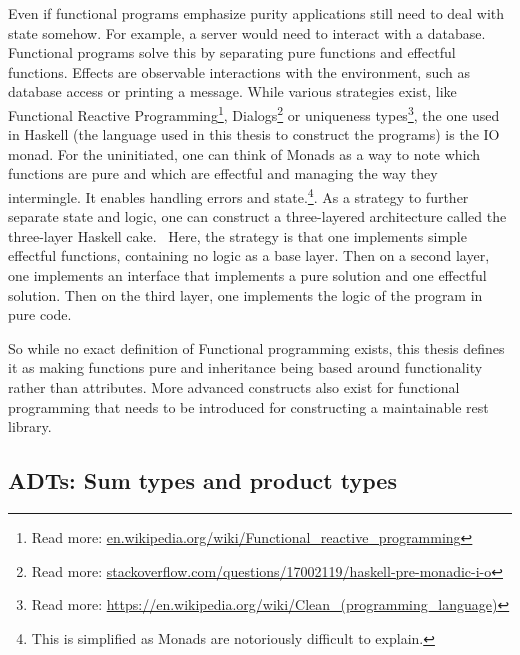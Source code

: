 \begin{description}
Even if functional programs emphasize purity applications still need to deal
        with state somehow. For example, a server would need to interact with a
        database. Functional programs solve this by separating pure functions
        and effectful functions. Effects are observable interactions with the
        environment, such as database access or printing a message.  While
        various strategies exist, like Functional Reactive
        Programming\footnote{Read more:
        \url{en.wikipedia.org/wiki/Functional_reactive_programming}},
        Dialogs\footnote{Read more:
        \url{stackoverflow.com/questions/17002119/haskell-pre-monadic-i-o}} or
        uniqueness types\footnote{Read more:
        \url{https://en.wikipedia.org/wiki/Clean_(programming_language)}}, the
        one used in Haskell (the language used in this thesis to construct the
        programs) is the IO monad. For the uninitiated, one can think of Monads
        as a way to note which functions are pure and which are effectful and
        managing the way they intermingle. It enables handling errors
        and state.\footnote{This is simplified as Monads are notoriously
        difficult to explain.}.  As a strategy to further separate state and logic, one can construct a
three-layered architecture called the three-layer Haskell
cake.~\cite{parsonsmatt} Here,
        the strategy is that one implements simple effectful functions,
        containing no logic as a base layer. Then on a second layer, one
        implements an interface that implements a pure solution and one
        effectful solution. Then on the third layer, one implements the logic of
        the program in pure code.  
\end{description}

So while no exact definition of Functional programming exists, this thesis
defines it as making functions pure and inheritance being based around
functionality rather than attributes. More advanced constructs also exist for
functional programming that needs to be introduced for constructing a
maintainable rest library. 

\subsection{ADTs: Sum types and product types}\label{types}

